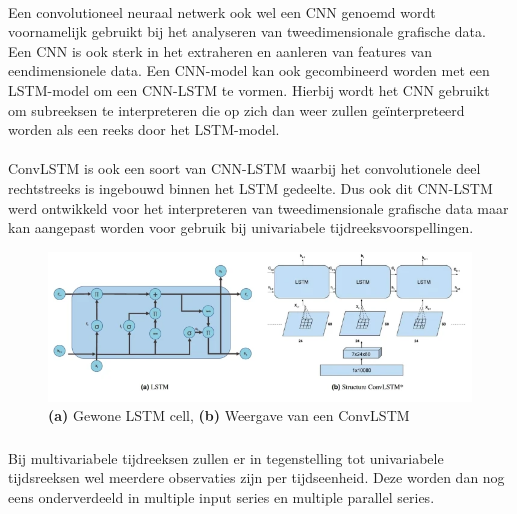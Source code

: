 \paragraph{}

Een convolutioneel neuraal netwerk ook wel een CNN genoemd wordt voornamelijk gebruikt bij het analyseren van tweedimensionale grafische data. Een CNN is ook sterk in het extraheren en aanleren van features van eendimensionele data. Een CNN-model kan ook gecombineerd worden met een LSTM-model om een CNN-LSTM te vormen. Hierbij wordt het CNN gebruikt om subreeksen te interpreteren die op zich dan weer zullen ge\"{i}nterpreteerd worden als een reeks door het LSTM-model. 

\paragraph{}

ConvLSTM is ook een soort van CNN-LSTM waarbij het convolutionele deel rechtstreeks is ingebouwd binnen het LSTM gedeelte. Dus ook dit CNN-LSTM werd ontwikkeld voor het interpreteren van tweedimensionale grafische data maar kan aangepast worden voor gebruik bij univariabele tijdreeksvoorspellingen.

\begin{figure}
    \centering
    \caption{\textbf{(a)} Gewone LSTM cell, \textbf{(b)} Weergave van een ConvLSTM~\autocite{Rahman2019}}
    \label{fig:ConvLSTM}
    \includegraphics[width=0.7\linewidth]{ConvLSTM}
\end{figure}


\subsubsection{}

Bij multivariabele tijdreeksen zullen er in tegenstelling tot univariabele tijdsreeksen wel meerdere observaties zijn per tijdseenheid. Deze worden dan nog eens onderverdeeld in multiple input series en multiple parallel series. 

